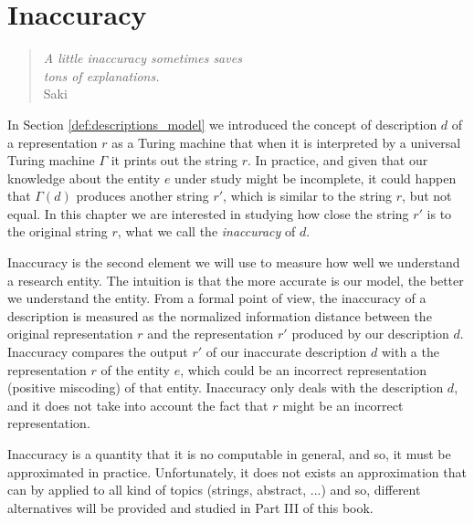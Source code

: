 %
%


\chapter{Inaccuracy}
\label{chap:Error}

\begin{quote}
\begin{flushright}
\emph{A little inaccuracy sometimes saves\\
tons of explanations.}\\
Saki
\end{flushright}
\end{quote}
\bigskip

In Section \ref{def:descriptions_model} we introduced the concept of description $d$ of a representation $r$ as a Turing machine that when it is interpreted by a universal Turing machine $\Gamma$ it prints out the string $r$. In practice, and given that our knowledge about the entity $e$ under study might be incomplete, it could happen that $\Gamma(d)$ produces another string $r'$, which is similar to the string $r$, but not equal. In this chapter we are interested in studying how close the string $r'$ is to the original string $r$, what we call the \emph{inaccuracy} of $d$.

Inaccuracy is the second element we will use to measure how well we understand a research entity. The intuition is that the more accurate is our model, the better we understand the entity. From a formal point of view, the inaccuracy of a description is measured as the normalized information distance between the original representation $r$ and the representation $r'$ produced by our description $d$. Inaccuracy compares the output $r'$ of our inaccurate description $d$ with a the representation $r$ of the entity $e$, which could be an incorrect representation (positive miscoding) of that entity. Inaccuracy only deals with the description $d$, and it does not take into account the fact that $r$ might be an incorrect representation.

Inaccuracy is a quantity that it is no computable in general, and so, it must be approximated in practice. Unfortunately, it does not exists an approximation that can by applied to all kind of topics (strings, abstract, ...) and so, different alternatives will be provided and studied in Part III of this book.

